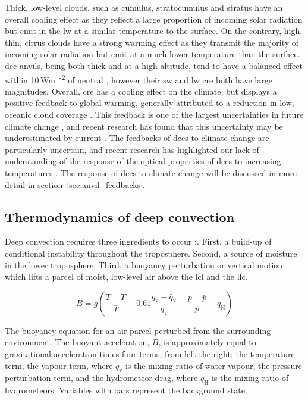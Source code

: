 Thick, low-level clouds, such as cumulus, stratocumulus and stratus have an overall cooling effect as they reflect a large proportion of incoming solar radiation but emit in the \acrshort{lw} at a similar temperature to the surface. 
On the contrary, high, thin, cirrus clouds have a strong warming effect as they transmit the majority of incoming solar radiation but emit at a much lower temperature than the surface. 
\acrshort{dcc} anvils, being both thick and at a high altitude, tend to have a balanced effect within 10\,\unit{Wm\textsuperscript{-2}} of neutral \citep{ramanathan_cloud-radiative_1989, hartmann_effect_1992, hartmann_tropical_2016}, however their \acrshort{sw} and \acrshort{lw} \acrshort{cre} both have large magnitudes. 
Overall, \acrshort{cre} has a cooling effect on the climate, but displays a positive feedback to global warming, generally attributed to a reduction in low, oceanic cloud coverage \citep{bony_clouds_2015}. 
This feedback is one of the largest uncertainties in future climate change \citep{sherwood_assessment_2020}, and recent research has found that this uncertainty may be underestimated by current  \citep{hill_climate_2023}.
The feedbacks of \acrshort{dcc}s to climate change are particularly uncertain, and recent research has highlighted our lack of understanding of the response of the optical properties of \acrshort{dcc}s to increasing temperatures \citep{mckim_weak_2024}.
The response of \acrshort{dcc}s to climate change will be discussed in more detail in section~\ref{sec:anvil_feedbacks}.


\subsection{Thermodynamics of deep convection}

Deep convection requires three ingredients to occur \citep{brooks_century_2019}:. 
First, a build-up of conditional instability throughout the troposphere. 
Second, a source of moisture in the lower troposphere. 
Third, a buoyancy perturbation or vertical motion which lifts a parcel of moist, low-level air above the \acrfull{lcl} and the \acrfull{lfc}.

\begin{eqfloat}
    \begin{equation}
    \label{eq:full_bouyancy}
        B = g \left ( \frac{T - \bar{T}}{\bar{T}} + 0.61 \frac{q_\mathrm{v} - \bar{q}_\mathrm{v}}{\bar{q}_\mathrm{v}} - \frac{p - \bar{p}}{\bar{p}} - q_\mathrm{H} \right )
    \end{equation}
    \caption{The buoyancy equation for an air parcel perturbed from the surrounding environment. The buoyant acceleration, $B$, is approximately equal to gravitational acceleration times four terms, from left the right: the temperature term, the vapour term, where $q_\mathrm{v}$ is the mixing ratio of water vapour, the pressure perturbation term, and the hydrometeor drag, where $q_\mathrm{H}$ is the mixing ratio of hydrometeors. Variables with bars represent the background state.}
\end{eqfloat}

